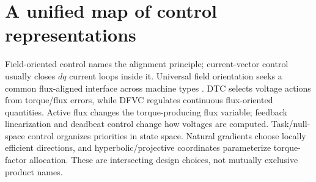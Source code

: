 \section{A unified map of control representations}
\label{sec:unified-coordinate-map}

Field-oriented control names the alignment principle; current-vector control
usually closes \(dq\) current loops inside it. Universal field orientation
seeks a common flux-aligned interface across machine types
\cite{profumo1992ufo,casadei2013unified}. DTC selects voltage actions from
torque/flux errors, while DFVC regulates continuous flux-oriented quantities.
Active flux changes the torque-producing flux variable; feedback
linearization and deadbeat control change how voltages are computed.
Task/null-space control organizes priorities in state space. Natural gradients
choose locally efficient directions, and hyperbolic/projective coordinates
parameterize torque-factor allocation. These are intersecting design choices,
not mutually exclusive product names.



